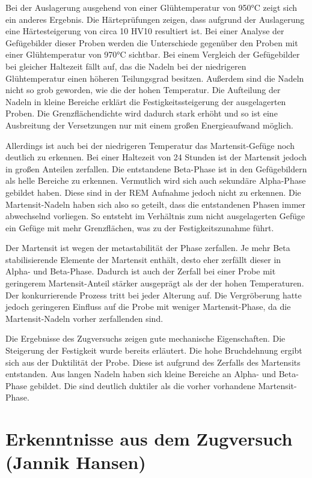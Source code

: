 \documentclass[a4paper, 11pt]{tubsreprt}
\begin{document}
Bei der Auslagerung ausgehend von einer Glühtemperatur von 950°C zeigt sich ein anderes Ergebnis. Die Härteprüfungen zeigen, dass aufgrund der Auslagerung eine Härtesteigerung von circa 10 HV10 resultiert ist. Bei einer Analyse der Gefügebilder dieser Proben werden die Unterschiede gegenüber den Proben mit einer Glühtemperatur von 970°C sichtbar. Bei einem Vergleich der Gefügebilder bei gleicher Haltezeit fällt auf, das die Nadeln bei der niedrigeren Glühtemperatur einen höheren Teilungsgrad besitzen. Außerdem sind die Nadeln nicht so grob geworden, wie die der hohen Temperatur. Die Aufteilung der Nadeln in kleine Bereiche erklärt die Festigkeitssteigerung der ausgelagerten Proben. Die Grenzflächendichte wird dadurch stark erhöht und so ist eine Ausbreitung der Versetzungen nur mit einem großen Energieaufwand möglich. 

Allerdings ist auch bei der niedrigeren Temperatur das Martensit-Gefüge noch deutlich zu erkennen. Bei einer Haltezeit von 24 Stunden ist der Martensit jedoch in großen Anteilen zerfallen. Die entstandene Beta-Phase ist in den Gefügebildern als helle Bereiche zu erkennen. Vermutlich wird sich auch sekundäre Alpha-Phase gebildet haben. Diese sind in der REM Aufnahme jedoch nicht zu erkennen. Die Martensit-Nadeln haben sich also so geteilt, dass die entstandenen Phasen immer abwechselnd vorliegen. So entsteht im Verhältnis zum nicht ausgelagerten Gefüge ein Gefüge mit mehr Grenzflächen, was zu der Festigkeitszunahme führt.

Der Martensit ist wegen der metastabilität der Phase zerfallen. Je mehr Beta stabilisierende Elemente der Martensit enthält, desto eher zerfällt dieser in Alpha- und Beta-Phase. Dadurch ist auch der Zerfall bei einer Probe mit geringerem Martensit-Anteil stärker ausgeprägt als der der hohen Temperaturen. Der konkurrierende Prozess tritt bei jeder Alterung auf. Die Vergröberung hatte jedoch geringeren Einfluss auf die Probe mit weniger Martensit-Phase, da die Martensit-Nadeln vorher zerfallenden sind. 


Die Ergebnisse des Zugversuchs zeigen gute mechanische Eigenschaften. Die Steigerung der Festigkeit wurde bereits erläutert. Die hohe Bruchdehnung ergibt sich aus der Duktilität der Probe. Diese ist aufgrund des Zerfalls des Martensits entstanden. Aus langen Nadeln haben sich kleine Bereiche an Alpha- und Beta-Phase gebildet. Die sind deutlich duktiler als die vorher vorhandene Martensit-Phase.

\newpage
\section{Erkenntnisse aus dem Zugversuch (Jannik Hansen)}
\end{document}
